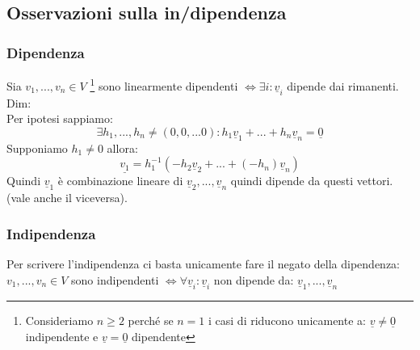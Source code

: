 \subsection{Osservazioni sulla in/dipendenza}
\subsubsection{Dipendenza}
Sia $v_1,...,v_n \in V$ \footnote{Consideriamo $n \ge 2$ perché se $n = 1$ i casi di riducono unicamente a: $ \underline{v} \neq \underline{0} $ indipendente e $ \underline{v} = \underline{0} $ dipendente} sono linearmente dipendenti $ \Leftrightarrow \exists i: \underline{v}_i $ dipende dai rimanenti.
Dim:\\
Per ipotesi sappiamo: 
$$ \exists h_1,...,h_n \neq (0,0,...0): h_1\underline{v}_1 + ... + h_n\underline{v}_n = \underline{0} $$
Supponiamo $h_1 \neq 0$ allora:
$$ \underline{v_1} = h_1^{-1}(-h_2\underline{v}_2 + ... + (-h_n)\underline{v}_n) $$
Quindi $\underline{v}_1$ è combinazione lineare di $\underline{v}_2,...,\underline{v}_n$ quindi dipende da questi vettori.\\
(vale anche il viceversa).

\subsubsection{Indipendenza}
Per scrivere l'indipendenza ci basta unicamente fare il negato della dipendenza:\\
$ v_1,...,v_n \in V $ sono indipendenti $ \Leftrightarrow \forall \underline{v}_i: \underline{v}_i$ non dipende da: $\underline{v}_1,...,\underline{v}_n $\\

